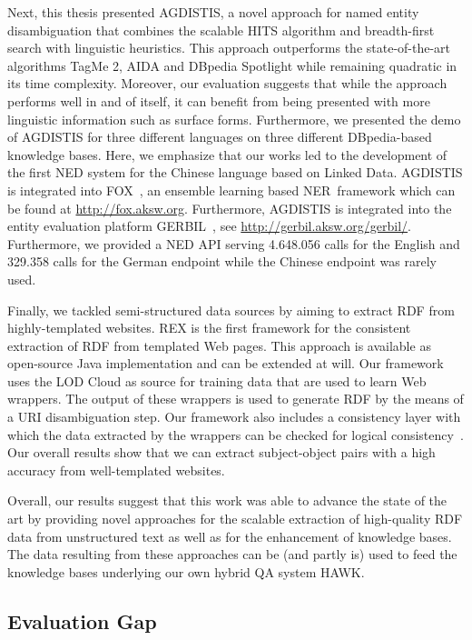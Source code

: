 Next, this thesis presented AGDISTIS, a novel approach for named entity disambiguation that combines the scalable \ac{HITS} algorithm and breadth-first search with linguistic heuristics.
This approach outperforms the state-of-the-art algorithms TagMe 2, AIDA and DBpedia Spotlight while remaining quadratic in its time complexity. 
Moreover, our evaluation suggests that while the approach performs well in and of itself, it can benefit from being presented with more linguistic information such as surface forms. 
Furthermore, we presented the demo of AGDISTIS for three different languages on three different DBpedia-based knowledge bases.
Here,  we emphasize that our works led to the development of the first \ac{NED} system for the Chinese language based on Linked Data.
AGDISTIS is integrated into FOX~\cite{FOX}, an ensemble learning based \ac{NER}~framework which can be found at \url{http://fox.aksw.org}. 
Furthermore, AGDISTIS is integrated into the entity evaluation platform GERBIL~\cite{GERBIL}, see \url{http://gerbil.aksw.org/gerbil/}.
Furthermore, we provided a \ac{NED} API serving 4.648.056 calls for the English and 329.358 calls for the German endpoint while the Chinese endpoint was rarely used.


Finally, we tackled semi-structured data sources by aiming to extract \ac{RDF} from highly-templated websites. 
REX is the first framework for the consistent extraction of \ac{RDF} from templated Web pages. 
This approach is available as open-source Java implementation and can be extended at will.
Our framework uses the \ac{LOD} Cloud as source for training data that are used to learn Web wrappers. 
The output of these wrappers is used to generate \ac{RDF} by the means of a URI disambiguation step.
Our framework also includes a consistency layer with which the data extracted by the wrappers can be checked for logical consistency~\cite{buhmann2012}.
Our overall results show that we can extract subject-object pairs with a high accuracy from well-templated websites.

Overall, our results suggest that this work was able to advance the state of the art by providing novel approaches for the scalable extraction of high-quality RDF data from unstructured text as well as for the enhancement of knowledge bases. 
The data resulting from these approaches can be (and partly is) used to feed the knowledge bases underlying our own hybrid \ac{QA} system HAWK. 


\subsection*{Evaluation Gap}

